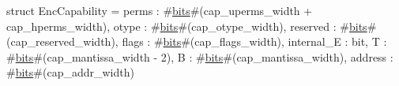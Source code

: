 struct EncCapability = {
  perms      : #\hyperref[sailRISCVzbits]{bits}#(cap_uperms_width + cap_hperms_width),
  otype      : #\hyperref[sailRISCVzbits]{bits}#(cap_otype_width),
  reserved   : #\hyperref[sailRISCVzbits]{bits}#(cap_reserved_width),
  flags      : #\hyperref[sailRISCVzbits]{bits}#(cap_flags_width),
  internal_E : bit,
  T          : #\hyperref[sailRISCVzbits]{bits}#(cap_mantissa_width - 2),
  B          : #\hyperref[sailRISCVzbits]{bits}#(cap_mantissa_width),
  address    : #\hyperref[sailRISCVzbits]{bits}#(cap_addr_width)
}
